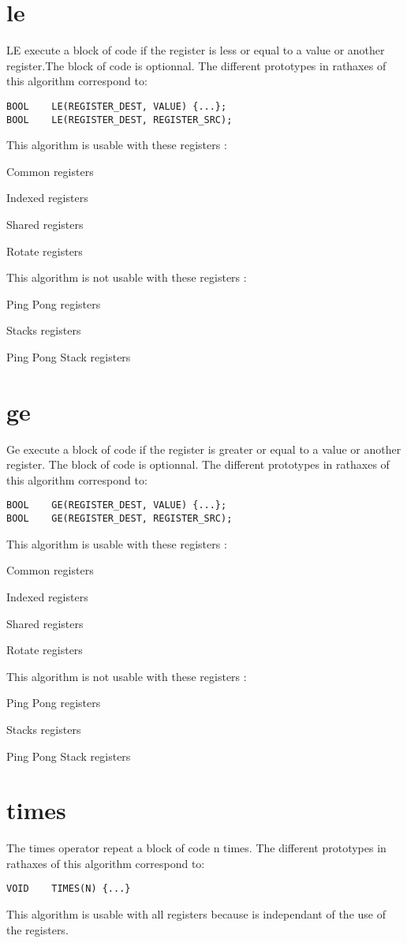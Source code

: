 \documentclass[11pt]{report}
\begin{document}
\section{le}
LE execute a block of code if the register is less or equal to a value
 or another register.The block of code is optionnal.
The different prototypes in rathaxes of this algorithm correspond to:
\begin{lstlisting}
BOOL	LE(REGISTER_DEST, VALUE) {...};
BOOL	LE(REGISTER_DEST, REGISTER_SRC);
\end{lstlisting}
This algorithm is usable with these registers : 
\begin{description}
	\item{Common registers}
	\item{Indexed registers}
	\item{Shared registers}
	\item{Rotate registers}
\end{description}
This algorithm is not usable with these registers : 
\begin{description}
	\item{Ping Pong registers}
	\item{Stacks registers}
	\item{Ping Pong Stack registers}
\end{description}

\section{ge}
Ge execute a block of code if the register is greater or equal to a value
or another register. The block of code is optionnal.
The different prototypes in rathaxes of this algorithm correspond to:
\begin{lstlisting}
BOOL	GE(REGISTER_DEST, VALUE) {...};
BOOL	GE(REGISTER_DEST, REGISTER_SRC);
\end{lstlisting}
This algorithm is usable with these registers : 
\begin{description}
	\item{Common registers}
	\item{Indexed registers}
	\item{Shared registers}
	\item{Rotate registers}
\end{description}
This algorithm is not usable with these registers : 
\begin{description}
	\item{Ping Pong registers}
	\item{Stacks registers}
	\item{Ping Pong Stack registers}
\end{description}

\section{times}
The times operator repeat a block of code n times. The different prototypes in
rathaxes of this algorithm correspond to:
\begin{lstlisting}
VOID	TIMES(N) {...}
\end{lstlisting}
This algorithm is usable with all registers because is independant of the use 
of the registers. 
\end{document}
